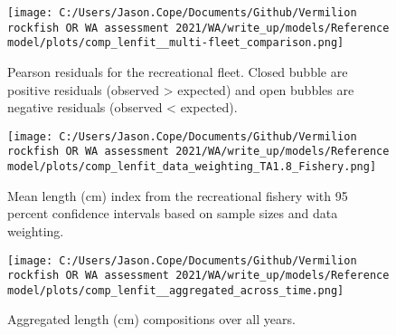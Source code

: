 \documentclass[11pt,
  english,
  a4paper,
]{article}
\begin{document}
\tagmcend\tagstructend


\begin{figure}
\centering
\texttt{[image: C:/Users/Jason.Cope/Documents/Github/Vermilion rockfish OR WA assessment 2021/WA/write\_up/models/Reference model/plots/comp\_lenfit\_\_multi-fleet\_comparison.png]}
\caption{Pearson residuals for the recreational fleet. Closed bubble are positive residuals (observed \textgreater{} expected) and open bubbles are negative residuals (observed \textless{} expected).\label{fig:rec-pearson}}
\end{figure}

\tagmcend\tagstructend


\begin{figure}
\centering
\texttt{[image: C:/Users/Jason.Cope/Documents/Github/Vermilion rockfish OR WA assessment 2021/WA/write\_up/models/Reference model/plots/comp\_lenfit\_data\_weighting\_TA1.8\_Fishery.png]}
\caption{Mean length (cm) index from the recreational fishery with 95 percent confidence intervals based on sample sizes and data weighting.\label{fig:rec-mean-len-fit}}
\end{figure}

\tagmcend\tagstructend


\begin{figure}
\centering
\texttt{[image: C:/Users/Jason.Cope/Documents/Github/Vermilion rockfish OR WA assessment 2021/WA/write\_up/models/Reference model/plots/comp\_lenfit\_\_aggregated\_across\_time.png]}
\caption{Aggregated length (cm) compositions over all years.\label{fig:agg-len-fit}}
\end{figure}

\tagmcend\tagstructend

\end{document}
